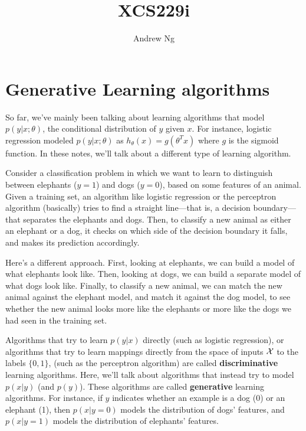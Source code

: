 \documentclass{article}
\begin{document}
\title{XCS229i}
\author{Andrew Ng}
\date{}
\maketitle


\setcounter{part}{3}
\part{Generative Learning algorithms}

So far, we've mainly been talking about learning algorithms that model $p(y|x;\theta)$, the
conditional distribution of $y$ given $x$.  For instance, logistic regression modeled
$p(y|x; \theta)$ as $h_\theta(x) = g(\theta^Tx)$ where $g$ is the sigmoid function.  In
these notes, we'll talk about a different type of learning algorithm.

Consider a classification problem in which we want to learn to distinguish between elephants ($y=1$)
and dogs ($y=0$), based on some features of an animal.  Given a training
set, an algorithm like logistic regression or the perceptron algorithm (basically) tries to
find a straight line---that is, a decision boundary---that separates the elephants and
dogs.  Then, to classify a new animal as either an elephant or a dog, it checks on which side of
the decision boundary it falls, and makes its prediction accordingly.

Here's a different approach.  First, looking at elephants, we can build a model of what
elephants look like.  Then, looking at dogs, we can build a separate model of what
dogs look like.  Finally, to classify a new animal, we can match the new animal against the
elephant model, and match it against the dog model, to see whether the new animal looks more
like the elephants or more like the dogs we had seen in the training set.

Algorithms that try to learn $p(y|x)$ directly (such as logistic regression), or algorithms
that try to learn mappings directly from the space of inputs ${\cal X}$ to the labels $\{0,1\}$,
(such as the perceptron algorithm) are called {\bf discriminative} learning algorithms.
Here, we'll talk about algorithms that instead try to model $p(x|y)$ (and $p(y)$).
These algorithms are called {\bf generative} learning algorithms.
For instance, if $y$ indicates whether an example is a dog (0) or an elephant
(1), then $p(x|y=0)$ models the distribution of dogs' features, and $p(x|y=1)$ models
the distribution of elephants' features.
\end{document}
